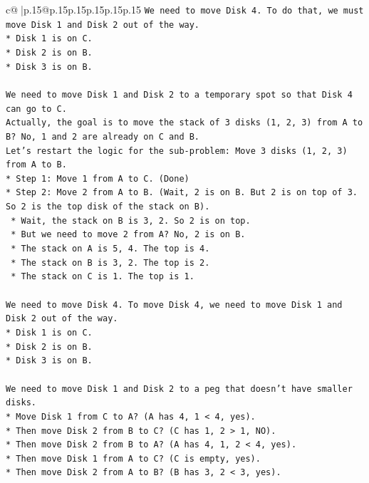 \documentclass{article}
\begin{document}
{\begin{supertabular}{c@{$\;$}|p{.15\linewidth}@{}p{.15\linewidth}p{.15\linewidth}p{.15\linewidth}p{.15\linewidth}p{.15\linewidth}}
{{{\texttt{We need to move Disk 4. To do that, we must move Disk 1 and Disk 2 out of the way.} \\
\texttt{*   Disk 1 is on C.} \\
\texttt{*   Disk 2 is on B.} \\
\texttt{*   Disk 3 is on B.} \\
\\ 
\texttt{We need to move Disk 1 and Disk 2 to a temporary spot so that Disk 4 can go to C.} \\
\texttt{Actually, the goal is to move the stack of 3 disks (1, 2, 3) from A to B? No, 1 and 2 are already on C and B.} \\
\texttt{Let's restart the logic for the sub{-}problem: Move 3 disks (1, 2, 3) from A to B.} \\
\texttt{*   Step 1: Move 1 from A to C. (Done)} \\
\texttt{*   Step 2: Move 2 from A to B. (Wait, 2 is on B. But 2 is on top of 3. So 2 is the top disk of the stack on B).} \\
\texttt{    *   Wait, the stack on B is 3, 2. So 2 is on top.} \\
\texttt{    *   But we need to move 2 from A? No, 2 is on B.} \\
\texttt{    *   The stack on A is 5, 4. The top is 4.} \\
\texttt{    *   The stack on B is 3, 2. The top is 2.} \\
\texttt{    *   The stack on C is 1. The top is 1.} \\
\\ 
\texttt{We need to move Disk 4. To move Disk 4, we need to move Disk 1 and Disk 2 out of the way.} \\
\texttt{*   Disk 1 is on C.} \\
\texttt{*   Disk 2 is on B.} \\
\texttt{*   Disk 3 is on B.} \\
\\ 
\texttt{We need to move Disk 1 and Disk 2 to a peg that doesn't have smaller disks.} \\
\texttt{*   Move Disk 1 from C to A? (A has 4, 1 < 4, yes).} \\
\texttt{*   Then move Disk 2 from B to C? (C has 1, 2 > 1, NO).} \\
\texttt{*   Then move Disk 2 from B to A? (A has 4, 1, 2 < 4, yes).} \\
\texttt{*   Then move Disk 1 from A to C? (C is empty, yes).} \\
\texttt{*   Then move Disk 2 from A to B? (B has 3, 2 < 3, yes).} \\
}}}
\end{supertabular}}
\end{document}
